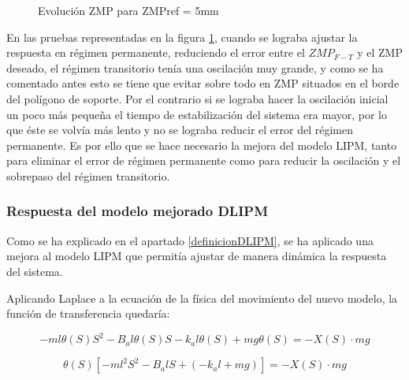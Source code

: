 \begin{figure}[H]
\quad
{}
\caption{Evolución ZMP para ZMPref = 5mm}
\label{figura57}
\end{figure}
 

En las pruebas representadas en la figura \ref{figura57}, cuando se lograba ajustar la respuesta en régimen permanente, reduciendo el error entre el $ZMP_{F-T}$ y el ZMP deseado, el régimen transitorio tenía una oscilación muy grande, y como se ha comentado antes esto se tiene que evitar sobre todo en ZMP situados en el borde del polígono de soporte. Por el contrario si se lograba hacer la oscilación inicial un poco más pequeña el tiempo de estabilización del sistema era mayor, por lo que éste se volvía más lento y no se lograba reducir el error del régimen permanente. Es por ello que se hace necesario la mejora del modelo LIPM, tanto para eliminar el error de régimen permanente como para reducir la oscilación y el sobrepaso del régimen transitorio.

\subsubsection{Respuesta del modelo mejorado DLIPM}

Como se ha explicado en el apartado \ref{definicionDLIPM}, se ha aplicado una mejora al modelo LIPM que permitía ajustar de manera dinámica la respuesta del sistema.

Aplicando Laplace a la ecuación de la física del movimiento del nuevo modelo, la función de transferencia quedaría:

\begin{equation*}
-ml{\theta}(S)S^{2} - B_a l{\theta}(S)S - k_a l\theta(S) + mg\theta(S)=- X(S) \cdot mg
\end{equation*}

\begin{equation*}
{\theta}(S)[-ml^{2}S^{2} - B_a lS + (-k_a l + mg)]=- X(S) \cdot mg
\end{equation*}


